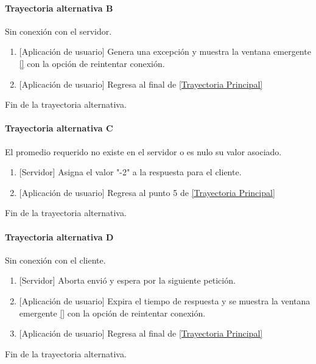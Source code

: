 \paragraph{Trayectoria alternativa B} \label{SUB-M-CU5:TB}
	Sin conexión con el servidor.
	\begin{enumerate}[label=B\arabic*.]
		\item {[Aplicación de usuario]} Genera una excepción y muestra la ventana emergente \ref{} con la opción de reintentar conexión.
		\item {[Aplicación de usuario]} Regresa al final de \hyperref[SUB-M-CU6:TP]{[Trayectoria Principal]} 
	\end{enumerate}
	Fin de la trayectoria alternativa.

\paragraph{Trayectoria alternativa C} \label{SUB-M-CU6:TC}
	El promedio requerido no existe en el servidor o es nulo su valor asociado.
	\begin{enumerate}[label=C\arabic*.]
		\item {[Servidor]} Asigna el valor "-2" a la respuesta para el cliente.
		\item {[Aplicación de usuario]} Regresa al punto 5 de \hyperref[SUB-M-CU6:TP]{[Trayectoria Principal]}
	\end{enumerate}
	Fin de la trayectoria alternativa.

\paragraph{Trayectoria alternativa D} \label{SUB-M-CU6:TD}
	Sin conexión con el cliente.
	\begin{enumerate}[label=D\arabic*.]
		\item {[Servidor]} Aborta envió y espera por la siguiente petición.
		\item {[Aplicación de usuario]} Expira el tiempo de respuesta y se muestra la ventana emergente \ref{} con la opción de reintentar conexión.
		\item {[Aplicación de usuario]} Regresa al final de \hyperref[SUB-M-CU6:TP]{[Trayectoria Principal]} 
	\end{enumerate}
	Fin de la trayectoria alternativa.